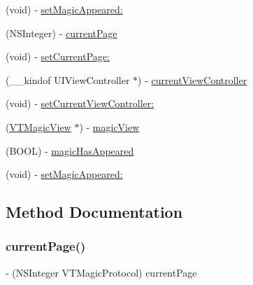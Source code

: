 \begin{DoxyCompactItemize}
\item 
(void) -\/ \mbox{\hyperlink{protocol_v_t_magic_protocol_01-p_a4c56f62764bbc1306d593c7a940a117d}{set\+Magic\+Appeared\+:}}
\item 
(N\+S\+Integer) -\/ \mbox{\hyperlink{protocol_v_t_magic_protocol_01-p_a98f587198f915434883688d84011c27e}{current\+Page}}
\item 
(void) -\/ \mbox{\hyperlink{protocol_v_t_magic_protocol_01-p_a6edd711844c9f2a939330cd59503de49}{set\+Current\+Page\+:}}
\item 
(\+\_\+\+\_\+kindof U\+I\+View\+Controller $\ast$) -\/ \mbox{\hyperlink{protocol_v_t_magic_protocol_01-p_a5b2aadaa842bf3a509beeced253c61a0}{current\+View\+Controller}}
\item 
(void) -\/ \mbox{\hyperlink{protocol_v_t_magic_protocol_01-p_a2e54d402f3dcf7a12304b008debab60c}{set\+Current\+View\+Controller\+:}}
\item 
(\mbox{\hyperlink{interface_v_t_magic_view}{V\+T\+Magic\+View}} $\ast$) -\/ \mbox{\hyperlink{protocol_v_t_magic_protocol_01-p_af6d4673d61ebc6fc4147788e653cf3b7}{magic\+View}}
\item 
(B\+O\+OL) -\/ \mbox{\hyperlink{protocol_v_t_magic_protocol_01-p_afd680bc89cd364f7eebdebcb248969b5}{magic\+Has\+Appeared}}
\item 
(void) -\/ \mbox{\hyperlink{protocol_v_t_magic_protocol_01-p_a4c56f62764bbc1306d593c7a940a117d}{set\+Magic\+Appeared\+:}}
\end{DoxyCompactItemize}


\subsection{Method Documentation}
\mbox{\label{protocol_v_t_magic_protocol_01-p_a98f587198f915434883688d84011c27e}} 
\subsubsection{\texorpdfstring{current\+Page()}{currentPage()}\hspace{0.1cm}{\footnotesize\ttfamily [1/3]}}
{\footnotesize\ttfamily -\/ (N\+S\+Integer V\+T\+Magic\+Protocol) current\+Page \begin{DoxyParamCaption}{ }\end{DoxyParamCaption}\hspace{0.3cm}{\ttfamily [required]}}

